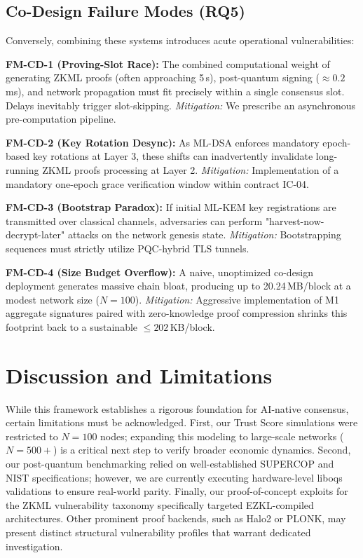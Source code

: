 \documentclass[journal]{IEEEtran}
\begin{document}
\subsection{Co-Design Failure Modes (RQ5)}

Conversely, combining these systems introduces acute operational vulnerabilities:

\textbf{FM-CD-1 (Proving-Slot Race):}
The combined computational weight of generating ZKML proofs (often approaching 5\,s), post-quantum signing ($\approx 0.2$\,ms), and network propagation must fit precisely within a single consensus slot. Delays inevitably trigger slot-skipping. \textit{Mitigation:} We prescribe an asynchronous pre-computation pipeline.

\textbf{FM-CD-2 (Key Rotation Desync):}
As ML-DSA enforces mandatory epoch-based key rotations at Layer 3, these shifts can inadvertently invalidate long-running ZKML proofs processing at Layer 2. \textit{Mitigation:} Implementation of a mandatory one-epoch grace verification window within contract IC-04.

\textbf{FM-CD-3 (Bootstrap Paradox):}
If initial ML-KEM key registrations are transmitted over classical channels, adversaries can perform "harvest-now-decrypt-later" attacks on the network genesis state. \textit{Mitigation:} Bootstrapping sequences must strictly utilize PQC-hybrid TLS tunnels.

\textbf{FM-CD-4 (Size Budget Overflow):}
A naive, unoptimized co-design deployment generates massive chain bloat, producing up to 20.24\,MB/block at a modest network size ($N=100$). \textit{Mitigation:} Aggressive implementation of M1 aggregate signatures paired with zero-knowledge proof compression shrinks this footprint back to a sustainable $\leq 202$\,KB/block.

\section{Discussion and Limitations}
\label{sec:discussion}

While this framework establishes a rigorous foundation for AI-native consensus, certain limitations must be acknowledged. First, our Trust Score simulations were restricted to $N=100$ nodes; expanding this modeling to large-scale networks ($N=500+$) is a critical next step to verify broader economic dynamics. Second, our post-quantum benchmarking relied on well-established SUPERCOP and NIST specifications; however, we are currently executing hardware-level liboqs validations to ensure real-world parity. Finally, our proof-of-concept exploits for the ZKML vulnerability taxonomy specifically targeted EZKL-compiled architectures. Other prominent proof backends, such as Halo2 or PLONK, may present distinct structural vulnerability profiles that warrant dedicated investigation.
\end{document}
